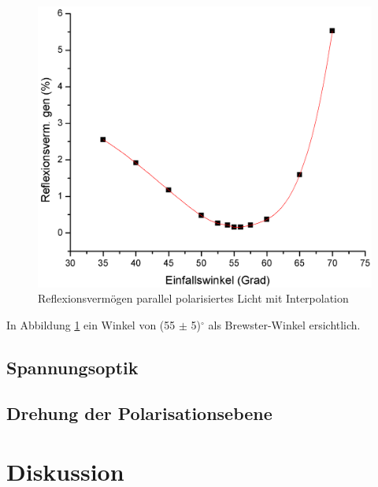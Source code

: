\documentclass[12pt,a4paper]{article}
\begin{document}
\begin{multicols}{2}
\begin{figure}[H]
	\centering
	\includegraphics[scale=0.28]{./data/R_P_Plot.png}
	\caption{Reflexionsvermögen parallel polarisiertes Licht mit Interpolation}
	\label{fig:r_p_plot}
\end{figure}
In Abbildung \ref{fig:r_p_plot} ein Winkel von (55 $\pm$ 5)$^\circ$ als Brewster-Winkel ersichtlich.
\subsection{Spannungsoptik}




\subsection{Drehung der Polarisationsebene}




\section{Diskussion}


\end{multicols}
\end{document}
